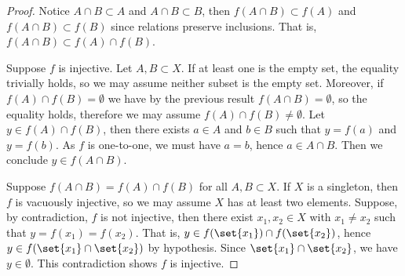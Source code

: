 \begin{proof}
    Notice \(A \cap B \subset A\) and \(A \cap B \subset B\), then \(f(A \cap B) \subset f(A)\) and \(f(A \cap B) \subset f(B)\) since relations preserve inclusions. That is, \(f(A\cap B) \subset f(A) \cap f(B)\).

    Suppose \(f\) is injective. Let \(A, B \subset X\). If at least one is the empty set, the equality trivially holds, so we may assume neither subset is the empty set. Moreover, if \(f(A) \cap f(B) = \emptyset\) we have by the previous result \(f(A \cap B) = \emptyset\), so the equality holds, therefore we may assume \(f(A) \cap f(B) \neq \emptyset.\) Let \(y \in f(A) \cap f(B)\), then there exists \(a \in A\) and \(b \in B\) such that \(y = f(a)\) and \(y = f(b)\). As \(f\) is one-to-one, we must have \(a = b\), hence \(a \in A \cap B\). Then we conclude \(y \in f(A \cap B)\).

    Suppose \(f(A \cap B) = f(A) \cap f(B)\) for all \(A, B \subset X\). If \(X\) is a singleton, then \(f\) is vacuously injective, so we may assume \(X\) has at least two elements. Suppose, by contradiction, \(f\) is not injective, then there exist \(x_1, x_2 \in X\) with \(x_1 \neq x_2\) such that \(y = f(x_1) = f(x_2)\). That is, \(y \in f(\set{x_1}) \cap f(\set{x_2})\), hence \(y \in f(\set{x_1} \cap \set{x_2})\) by hypothesis. Since \(\set{x_1} \cap \set{x_2}\), we have \(y \in \emptyset\). This contradiction shows \(f\) is injective.
\end{proof}

